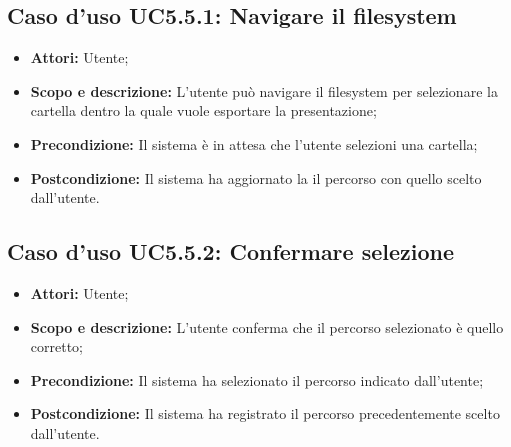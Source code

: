 	\subsection{Caso d'uso UC5.5.1: Navigare il filesystem}
	\begin{itemize}
		\item \textbf{Attori:} Utente;
		\item \textbf{Scopo e descrizione:} L'utente può navigare il \gls{filesystem} per selezionare la cartella dentro la quale vuole esportare la presentazione;
		\item \textbf{Precondizione:} Il sistema è in attesa che l'utente selezioni una cartella;
		\item \textbf{Postcondizione:} Il sistema ha aggiornato la il percorso con quello scelto dall'utente.
	\end{itemize}
	
	\subsection{Caso d'uso UC5.5.2: Confermare selezione}
	\begin{itemize}
		\item \textbf{Attori:} Utente;
		\item \textbf{Scopo e descrizione:} L'utente conferma che il percorso selezionato è quello corretto;
		\item \textbf{Precondizione:} Il sistema ha selezionato il percorso indicato dall'utente;
		\item \textbf{Postcondizione:} Il sistema ha registrato il percorso precedentemente scelto dall'utente.
	\end{itemize}